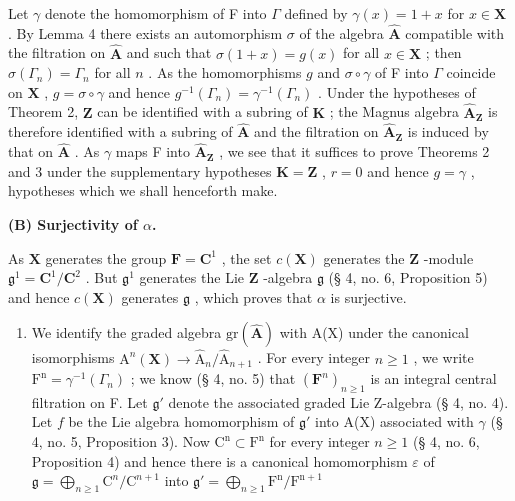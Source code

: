 Let \(\gamma\) denote the homomorphism of F into \(\Gamma\) defined by \(\gamma(x) = 1 + x\) for \(x \in \mathbf{X}\) . By Lemma 4 there exists an automorphism \(\sigma\) of the algebra \(\hat{\mathbf{A}}\) compatible with the filtration on \(\hat{\mathbf{A}}\) and such that \(\sigma(1 + x) = g(x)\) for all \(x \in \mathbf{X}\) ; then \(\sigma(\Gamma_n) = \Gamma_n\) for all \(n\) . As the homomorphisms \(g\) and \(\sigma \circ \gamma\) of F into \(\Gamma\) coincide on \(\mathbf{X}\) , \(g = \sigma \circ \gamma\) and hence \(g^{-1}(\Gamma_n) = \gamma^{-1}(\Gamma_n)\) . Under the hypotheses of Theorem 2, \(\mathbf{Z}\) can be identified with a subring of \(\mathbf{K}\) ; the Magnus algebra \(\hat{\mathbf{A}}_{\mathbf{Z}}\) is therefore identified with a subring of \(\hat{\mathbf{A}}\) and the filtration on \(\hat{\mathbf{A}}_{\mathbf{Z}}\) is induced by that on \(\hat{\mathbf{A}}\) . As \(\gamma\) maps F into \(\hat{\mathbf{A}}_{\mathbf{Z}}\) , we see that it suffices to prove Theorems 2 and 3 under the supplementary hypotheses \(\mathbf{K} = \mathbf{Z}\) , \(r = 0\) and hence \(g = \gamma\) , hypotheses which we shall henceforth make.

\textbf{(B) Surjectivity of \(\alpha\).}

As \(\mathbf{X}\) generates the group \(\mathbf{F} = \mathbf{C}^1\) , the set \(c(\mathbf{X})\) generates the \(\mathbf{Z}\) -module \(\mathfrak{g}^1 = \mathbf{C}^1 / \mathbf{C}^2\) . But \(\mathfrak{g}^1\) generates the Lie \(\mathbf{Z}\) -algebra \(\mathfrak{g}\) (§ 4, no. 6, Proposition 5) and hence \(c(\mathbf{X})\) generates \(\mathfrak{g}\) , which proves that \(\alpha\) is surjective.

\begin{enumerate}
\def\labelenumi{(\Alph{enumi})}
\setcounter{enumi}{2}
\tightlist
\item
  We identify the graded algebra \(\mathrm{gr}(\hat{\mathbf{A}})\) with A(X) under the canonical isomorphisms \(\mathrm{A}^n (\mathbf{X})\to \hat{\mathrm{A}}_n / \hat{\mathrm{A}}_{n + 1}\) . For every integer \(n\geqslant 1\) , we write \(\mathrm{F^n} = \gamma^{-1}(\Gamma_n)\) ; we know (§ 4, no. 5) that \((\mathbf{F}^n)_{n\geqslant 1}\) is an integral central filtration on F. Let \(\mathfrak{g}'\) denote the associated graded Lie Z-algebra (§ 4, no. 4). Let \(f\) be the Lie algebra homomorphism of \(\mathfrak{g}'\) into A(X) associated with \(\gamma\) (§ 4, no. 5, Proposition 3). Now \(\mathrm{C^n}\subset \mathrm{F^n}\) for every integer \(n\geqslant 1\) (§ 4, no. 6, Proposition 4) and hence there is a canonical homomorphism \(\varepsilon\) of \(\mathfrak{g} = \bigoplus_{n\geqslant 1}\mathrm{C}^n /\mathrm{C}^{n + 1}\) into \(\mathfrak{g}' = \bigoplus_{n\geqslant 1}\mathrm{F^n / F^{n + 1}}\)
\end{enumerate}

